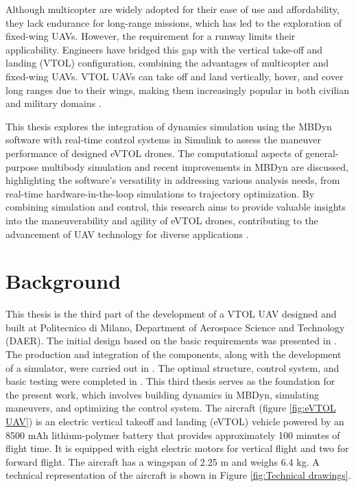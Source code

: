 \documentclass{Configuration_Files/PoliMi3i_thesis}
\begin{document}
Although multicopter are widely adopted for their ease of use and affordability, they lack endurance for long-range missions, which has led to the exploration of fixed-wing UAVs. However, the requirement for a runway limits their applicability. Engineers have bridged this gap with the vertical take-off and landing (VTOL) configuration, combining the advantages of multicopter and fixed-wing UAVs. VTOL UAVs can take off and land vertically, hover, and cover long ranges due to their wings, making them increasingly popular in both civilian and military domains \cite{DeMori2021}.

This thesis explores the integration of dynamics simulation using the MBDyn software with real-time control systems in Simulink to assess the maneuver performance of designed eVTOL drones. The computational aspects of general-purpose multibody simulation and recent improvements in MBDyn are discussed, highlighting the software's versatility in addressing various analysis needs, from real-time hardware-in-the-loop simulations to trajectory optimization. By combining simulation and control, this research aims to provide valuable insights into the maneuverability and agility of eVTOL drones, contributing to the advancement of UAV technology for diverse applications \cite{Zhang9460809}.

\section*{Background}
This thesis is the third part of the development of a VTOL UAV designed and built at Politecnico di Milano, Department of Aerospace Science and Technology (DAER). The initial design based on the basic requirements was presented in \cite{battaini2020}. The production and integration of the components, along with the development of a simulator, were carried out in \cite{martello2021}. The optimal structure, control system, and basic testing were completed in \cite{battaini2022}. This third thesis serves as the foundation for the present work, which involves building dynamics in MBDyn, simulating maneuvers, and optimizing the control system. The aircraft (figure \ref{fig:eVTOL UAV}) is an electric vertical takeoff and landing (eVTOL) vehicle powered by an 8500 mAh lithium-polymer battery that provides approximately 100 minutes of flight time. It is equipped with eight electric motors for vertical flight and two for forward flight. The aircraft has a wingspan of 2.25 m and weighs 6.4 kg. A technical representation of the aircraft is shown in Figure \ref{fig:Technical drawings}.
\end{document}
